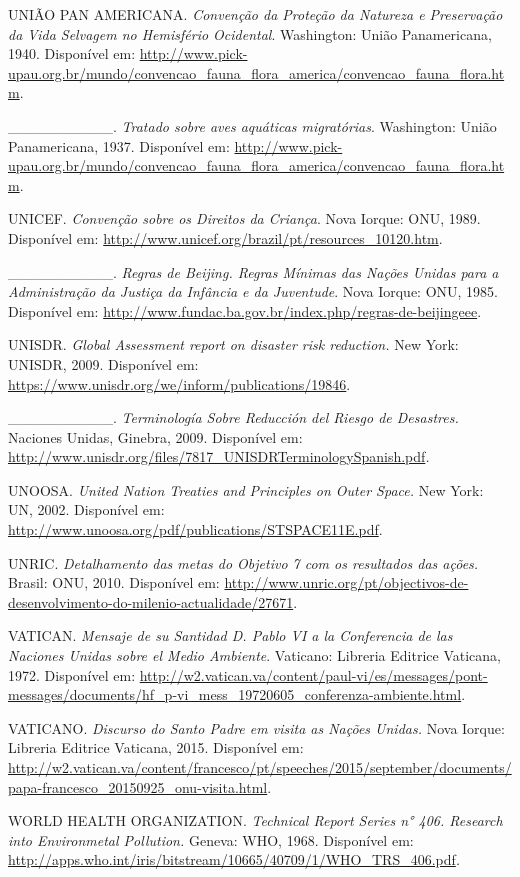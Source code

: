UNIÃO PAN AMERICANA. \emph{Convenção da Proteção da Natureza e
Preservação da Vida Selvagem no Hemisfério Ocidental}. Washington: União
Panamericana, 1940. Disponível em:
\url{http://www.pick-upau.org.br/mundo/convencao_fauna_flora_america/convencao_fauna_flora.htm}.

\_\_\_\_\_\_\_\_\_\_. \emph{Tratado sobre aves aquáticas migratórias}.
Washington: União Panamericana, 1937. Disponível em:
\url{http://www.pick-upau.org.br/mundo/convencao_fauna_flora_america/convencao_fauna_flora.htm}.

UNICEF. \emph{Convenção sobre os Direitos da Criança}. Nova Iorque: ONU,
1989. Disponível em:
\url{http://www.unicef.org/brazil/pt/resources_10120.htm}.

\_\_\_\_\_\_\_\_\_\_. \emph{Regras de Beijing. Regras Mínimas das Nações
Unidas para a Administração da Justiça da Infância e da Juventude}. Nova
Iorque: ONU, 1985. Disponível em:
\url{http://www.fundac.ba.gov.br/index.php/regras-de-beijingeee}.

UNISDR. \emph{Global Assessment report on disaster risk reduction.} New
York: UNISDR, 2009. Disponível em:
\url{https://www.unisdr.org/we/inform/publications/19846}.

\_\_\_\_\_\_\_\_\_\_. \emph{Terminología Sobre Reducción del Riesgo de
Desastres.} Naciones Unidas, Ginebra, 2009. Disponível em:
\url{http://www.unisdr.org/files/7817_UNISDRTerminologySpanish.pdf}\emph{.}

UNOOSA. \emph{United Nation Treaties and Principles on Outer Space.} New
York: UN, 2002. Disponível em:
\url{http://www.unoosa.org/pdf/publications/STSPACE11E.pdf}.

UNRIC. \emph{Detalhamento das metas do Objetivo 7 com os resultados das
ações.} Brasil: ONU, 2010. Disponível em:
\url{http://www.unric.org/pt/objectivos-de-desenvolvimento-do-milenio-actualidade/27671}.

VATICAN. \emph{Mensaje de su Santidad D. Pablo VI a la Conferencia de
las Naciones Unidas sobre el Medio Ambiente}. Vaticano: Libreria
Editrice Vaticana, 1972. Disponível em:
\url{http://w2.vatican.va/content/paul-vi/es/messages/pont-messages/documents/hf_p-vi_mess_19720605_conferenza-ambiente.html}.

VATICANO. \emph{Discurso do Santo Padre em visita as Nações Unidas.}
Nova Iorque: Libreria Editrice Vaticana, 2015. Disponível em:
\url{http://w2.vatican.va/content/francesco/pt/speeches/2015/september/documents/papa-francesco_20150925_onu-visita.html}.

WORLD HEALTH ORGANIZATION. \emph{Technical Report Series n° 406.
Research into Environmetal Pollution.} Geneva: WHO, 1968. Disponível em:
\url{http://apps.who.int/iris/bitstream/10665/40709/1/WHO_TRS_406.pdf}\emph{.}

